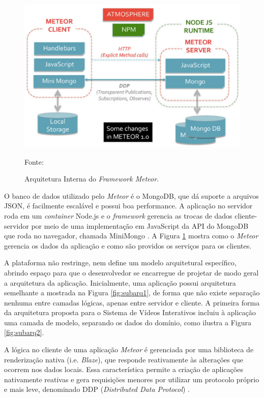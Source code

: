 \begin{figure}[h!]
	\centering
	\includegraphics[width=.65\linewidth]{figuras/meteorarq.eps}	
  	\caption{Arquitetura Interna do \textit{Framework Meteor}.}
	\small{Fonte: \cite{mongodb2015}}
  	\label{fig:meteorarq}
\end{figure}

O banco de dados utilizado pelo \textit{Meteor} é o MongoDB, que dá suporte a arquivos JSON, é facilmente escalável e possui boa performance. A aplicação no servidor roda em um \textit{container} Node.js e o \textit{framework} gerencia as trocas de dados cliente-servidor por meio de uma implementação em JavaScript da API do MongoDB que roda no navegador, chamada MiniMongo \cite{mongodb2015}. A Figura \ref{fig:meteorarq} mostra como o \textit{Meteor}  gerencia os dados da aplicação e como são providos os serviços para os clientes. 

A plataforma não restringe, nem define um modelo arquitetural específico, abrindo espaço para que o desenvolvedor se encarregue de projetar de modo geral a arquitetura da aplicação. Inicialmente, uma aplicação possui arquitetura semelhante a mostrada na Figura \ref{fig:subarq1}, de forma que não existe separação nenhuma entre camadas lógicas, apenas entre servidor e cliente. A primeira forma da arquitetura proposta para o Sistema de Vídeos Interativos incluiu à aplicação uma camada de modelo, separando os dados do domínio, como ilustra a Figura \ref{fig:subarq2}.

A lógica no cliente de uma aplicação \textit{Meteor} é gerenciada por uma biblioteca de renderização nativa (i.e. \textit{Blaze}), que responde reativamente às alterações que ocorrem nos dados locais. Essa característica permite a criação de aplicações nativamente reativas e gera requisições menores por utilizar um protocolo próprio e mais leve, denominado DDP (\textit{Distributed Data Protocol}) \cite{blaze2015}. 

